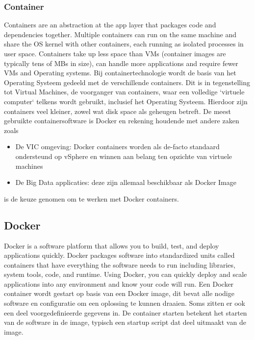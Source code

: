 \subsubsection{Container}
Containers are an abstraction at the app layer that packages code and dependencies together. Multiple containers can run on the same machine and share the OS kernel with other containers, each running as isolated processes in user space. Containers take up less space than VMs (container images are typically tens of MBs in size), can handle more applications and require fewer VMs and Operating systems.\autocite{Docker2023a}
\newline
\newline
Bij containertechnologie wordt de basis van het Operating Systeem gedeeld met de verschillende containers. Dit is in tegenstelling tot Virtual Machines, de voorganger van containers, waar een volledige `virtuele computer` telkens wordt gebruikt, inclusief het Operating Systeem. Hierdoor zijn containers veel kleiner, zowel wat disk space als geheugen betreft.
\newline
\newline
De meest gebruikte containersoftware is Docker en rekening houdende met andere zaken zoals
\begin{itemize}
    \item De VIC omgeving: Docker containers worden als de-facto standaard ondersteund op vSphere en winnen aan belang ten opzichte van virtuele machines
    \item De Big Data applicaties: deze zijn allemaal beschikbaar als Docker Image
\end{itemize}
is de keuze genomen om te werken met Docker containers.

\subsection{Docker}
Docker is a software platform that allows you to build, test, and deploy applications quickly. Docker packages software into standardized units called containers that have everything the software needs to run including libraries, system tools, code, and runtime. Using Docker, you can quickly deploy and scale applications into any environment and know your code will run. \autocite{AwsAmazon2023}
\newline
\newline
Een Docker container wordt gestart op basis van een Docker image, dit bevat alle nodige software en configuratie om een oplossing te kunnen draaien. Soms zitten er ook een deel voorgedefinieerde gegevens in. De container starten betekent het starten van de software in de image, typisch een startup script dat deel uitmaakt van de image.

